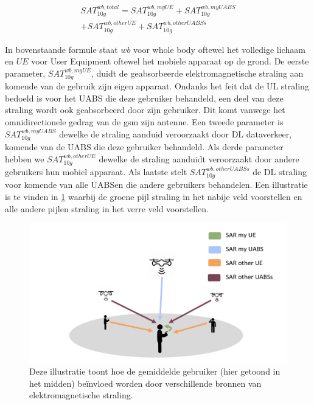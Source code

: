 \documentclass[twocolumn]{phdsymp} %
\begin{document}
\begin{equation} 
\begin{aligned}
SAT^{wb,total}_{10g} = SAT^{wb,myUE}_{10g} +  SAT^{wb,myUABS}_{10g} \\
+ SAT^{wb,otherUE}_{10g} + SAT^{wb,otherUABSs}_{10g}
\end{aligned}
\label{eq:overallSARwb}
\end{equation}

In bovenstaande formule staat $wb$ voor whole body oftewel het volledige lichaam en $UE$ voor User Equipment oftewel het mobiele apparaat op de grond.
De eerste parameter, $SAT^{wb,myUE}_{10g}$, duidt de geabsorbeerde elektromagnetische straling aan komende van de gebruik zijn eigen apparaat.
Ondanks het feit dat de \gls{UL} straling bedoeld is voor het \gls{UABS} die deze gebruiker behandeld,
een deel van deze straling wordt ook geabsorbeerd door zijn gebruiker. 
Dit komt vanwege het omnidirectionele gedrag van de gsm zijn antenne.
Een tweede parameter is $SAT^{wb,myUABS}_{10g}$ dewelke de straling aanduid veroorzaakt door \gls{DL} dataverkeer, komende van de \gls{UABS} die deze gebruiker behandeld.
Als derde parameter hebben we $SAT^{wb,otherUE}_{10g}$ dewelke de straling aanduidt veroorzaakt door andere gebruikers hun mobiel apparaat.
Als laatste stelt $SAT^{wb,otherUABSs}_{10g}$ de \gls{DL} straling voor komende van alle \gls{UABS}en die andere gebruikers behandelen.
Een illustratie is te vinden in \ref{fig:networkIllustration} waarbij de groene pijl straling in het nabije veld voorstellen en alle andere 
pijlen straling in het verre veld voorstellen.

\begin{figure}[h!]
\centering
  \includegraphics[width=\linewidth]{networkIllustrationSARSources.png}
  \caption{Deze illustratie toont hoe de gemiddelde gebruiker (hier getoond in het midden) be\"invloed worden door verschillende bronnen van elektromagnetische straling.}
  \label{fig:networkIllustration}
\end{figure}
\end{document}
